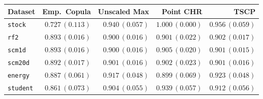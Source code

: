 \begin{tabular}{lrrrr}
\toprule
Dataset & Emp.\ Copula & Unscaled Max & Point CHR & TSCP \\
\midrule
\texttt{stock} & $0.727\,(0.113)$ & $0.940\,(0.057)$ & $1.000\,(0.000)$ & $0.956\,(0.059)$ \\
\texttt{rf2} & $0.893\,(0.016)$ & $0.900\,(0.016)$ & $0.901\,(0.022)$ & $0.902\,(0.017)$ \\
\texttt{scm1d} & $0.893\,(0.016)$ & $0.900\,(0.016)$ & $0.905\,(0.020)$ & $0.901\,(0.015)$ \\
\texttt{scm20d} & $0.892\,(0.017)$ & $0.901\,(0.016)$ & $0.902\,(0.023)$ & $0.901\,(0.016)$ \\
\texttt{energy} & $0.887\,(0.061)$ & $0.917\,(0.048)$ & $0.899\,(0.069)$ & $0.923\,(0.048)$ \\
\texttt{student} & $0.861\,(0.073)$ & $0.904\,(0.055)$ & $0.939\,(0.057)$ & $0.912\,(0.056)$ \\
\bottomrule
\end{tabular}
